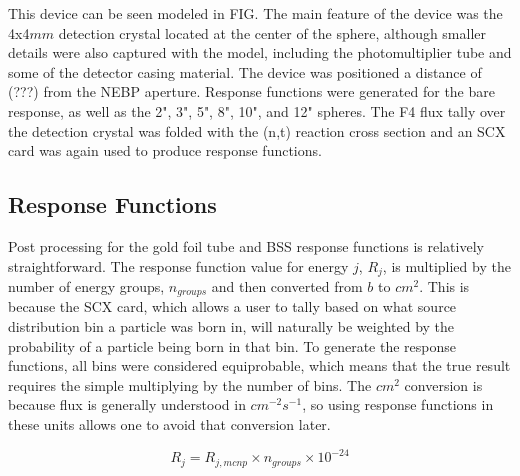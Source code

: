This device can be seen modeled in FIG.
The main feature of the device was the 4x4$mm$ detection crystal located at the center of the sphere, although smaller details were also captured with the model, including the photomultiplier tube and some of the detector casing material.
The device was positioned a distance of (???) from the NEBP aperture.
Response functions were generated for the bare response, as well as the 2", 3", 5", 8", 10", and 12" spheres.
The F4 flux tally over the detection crystal was folded with the (n,t) reaction cross section and an SCX card was again used to produce response functions.



\subsection{Response Functions}


Post processing for the gold foil tube and BSS response functions is relatively straightforward.
The response function value for energy $j$, $R_j$, is multiplied by the number of energy groups, $n_{groups}$ and then converted from $b$ to $cm^2$.
This is because the SCX card, which allows a user to tally based on what source distribution bin a particle was born in, will naturally be weighted by the probability of a particle being born in that bin.
To generate the response functions, all bins were considered equiprobable, which means that the true result requires the simple multiplying by the number of bins.
The $cm^2$ conversion is because flux is generally understood in $cm^{-2}s^{-1}$, so using response functions in these units allows one to avoid that conversion later.

\begin{equation}
\label{eqn:postprocessing_au}
R_j = R_{j, mcnp} \times n_{groups} \times 10^{-24}
\end{equation}


